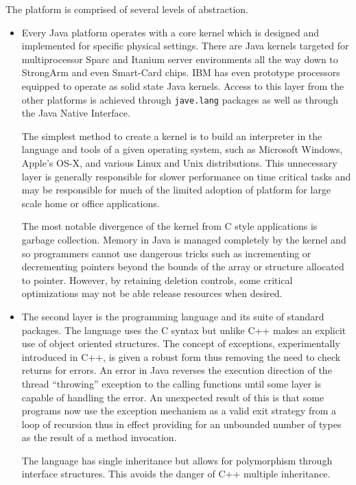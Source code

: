 \documentclass[12pt]{article}
\begin{document}
The platform is comprised of several levels of abstraction.
\begin{itemize}
\item Every Java platform operates with a core kernel which is designed and implemented for specific physical settings.  There are Java kernels
targeted for multiprocessor Sparc and Itanium server environments all the way down to StrongArm and even Smart-Card chips.  IBM has even prototype processors equipped to operate as  solid state Java kernels.  Access to this layer from the other platforms is achieved through \texttt{jave.lang} packages as well as through the Java Native Interface.

The simplest method to create a kernel is to build an interpreter in the
language and tools of a given operating system, such as Microsoft Windows, 
Apple's OS-X, and various Linux and Unix distributions.  This unnecessary 
layer is generally responsible for slower performance on time critical tasks 
and may be responsible for much of the limited adoption of platform for large scale home or office applications.

The most notable divergence of the kernel from C style applications is 
garbage collection.  Memory in Java is managed completely by the kernel and
so programmers cannot use dangerous tricks such as incrementing or decrementing pointers beyond the bounds of the array or structure allocated to pointer.
However, by retaining deletion controls, some critical optimizations may not
be able release resources when desired.


\item The second layer is the programming language and its suite of standard
packages.  The language uses the C syntax but unlike C++ makes an explicit
use of object oriented structures.  The concept of exceptions, experimentally introduced in C++, is given a robust form thus removing the need to 
check returns for errors.  An error in Java reverses the execution direction
of the thread ``throwing'' exception to the calling functions until some 
layer is capable of handling the error.  An unexpected result of this is that
some programs now use the exception mechanism as a valid exit strategy from
a loop of recursion thus in effect providing for an unbounded number of types
as the result of a method invocation.    

The language has single inheritance but allows for polymorphism through interface structures.  This avoids the danger of C++ multiple inheritance.  


\end{itemize}
\end{document}
